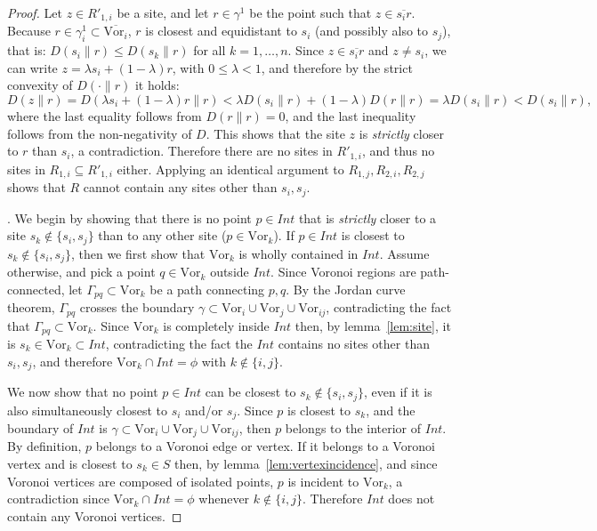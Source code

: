 \documentclass[11pt]{article}
\newcommand{\Sites}{S}
\newcommand{\Vor}{\text{Vor}}
\newcommand{\D}[2]{D\left(#1 \parallel #2\right)}
\begin{document}
\begin{proof}
Let $z\in R'_{1,i}$ be a site, and let $r\in\gamma^1$ be the point such that $z\in\overline{s_i r}$. 
Because $r\in\gamma^1_{i}\subset\overline{\Vor_i}$, $r$ is closest and equidistant to $s_i$ (and possibly also to $s_j$), 
	that is: $\D{s_i}{r} \le \D{s_k}{r}$ for all $k=1,\dots,n$. 
Since $z\in\overline{s_i r}$ and $z\ne s_i$, we can write $z=\lambda s_i + (1-\lambda) r$, with $0 \le \lambda < 1$, 
	and therefore by the strict convexity of $\D{\cdot}{r}$ it holds:
	\[ \D{z}{r} = \D{\lambda s_i + (1-\lambda) r}{r} < \lambda\D{s_i}{r} + (1-\lambda)\D{r}{r} = \lambda\D{s_i}{r} < \D{s_i}{r}, \]
where the last equality follows from $\D{r}{r}=0$, and the last inequality follows from the non-negativity of $D$. 
This shows that the site $z$ is \emph{strictly} closer to $r$ than $s_i$, a contradiction. 
Therefore there are no sites in $R'_{1,i}$, and thus no sites in $R_{1,i}\subseteq R'_{1,i}$ either. 
Applying an identical argument to $R_{1,j},R_{2,i},R_{2,j}$ shows that $R$ cannot contain any sites other than $s_i,s_j$. 


\vspace*{0.05in}.
We begin by showing that there is no point $p\in Int$ that is 
	\emph{strictly} closer to a site $s_k\notin \{s_i,s_j\}$ than to any other site ($p\in\Vor_k$). 
If $p\in Int$ is closest to $s_k\notin\{s_i,s_j\}$, then we first show that $\Vor_k$ is wholly contained in $Int$. 
Assume otherwise, and pick a point $q\in\Vor_k$ outside $Int$. 
Since Voronoi regions are path-connected, let $\Gamma_{pq}\subset\Vor_k$ be a path connecting $p,q$. 
By the Jordan curve theorem, $\Gamma_{pq}$ crosses the boundary $\gamma\subset \Vor_i\cup \Vor_j\cup \Vor_{ij}$, 
	contradicting the fact that $\Gamma_{pq}\subset\Vor_k$. 
Since $\Vor_k$ is completely inside $Int$ then, by lemma~\ref{lem:site}, it is $s_k\in\Vor_k\subset Int$, 
	contradicting the fact the $Int$ contains no sites other than $s_i,s_j$, and therefore $\Vor_k\cap Int=\phi$ with $k\notin\{i,j\}$. 


We now show that no point $p\in Int$ can be closest to $s_k\notin\{s_i,s_j\}$, even if it is also simultaneously closest to 
	$s_i$ and/or $s_j$. 
Since $p$ is closest to $s_k$, 
	and the boundary of $Int$ is $\gamma\subset \Vor_i\cup\Vor_j\cup\Vor_{ij}$, then $p$ belongs to the interior of $Int$. 
By definition, $p$ belongs to a Voronoi edge or vertex. If it belongs to a Voronoi vertex and is closest to $s_k\in\Sites$ then, 
	by lemma~\ref{lem:vertexincidence}, and since Voronoi vertices are composed of isolated points, 
	$p$ is incident to $\Vor_k$, a contradiction since $\Vor_k\cap Int=\phi$ whenever $k\notin\{i,j\}$. 
Therefore $Int$ does not contain any Voronoi vertices. 




\end{proof}
\end{document}
